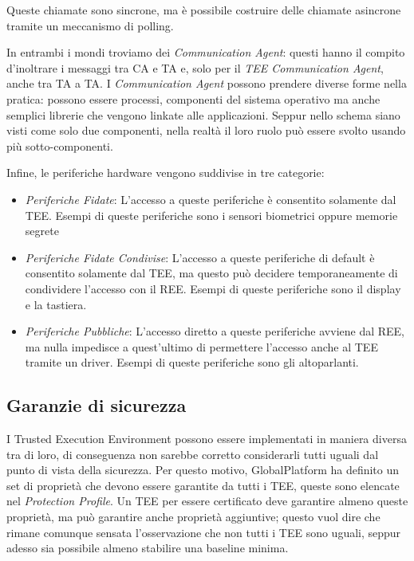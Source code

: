 \documentclass[12pt,italian]{report}
\begin{document}
Queste chiamate sono sincrone, ma è possibile costruire delle chiamate
asincrone tramite un meccanismo di polling.

In entrambi i mondi troviamo dei \textit{Communication Agent}: questi 
hanno il compito d'inoltrare i messaggi tra CA e TA e, solo per il
\textit{TEE Communication Agent}, anche tra TA a TA.
I \textit{Communication Agent} possono prendere diverse forme nella pratica:
possono essere processi, componenti del sistema operativo ma anche semplici
librerie che vengono linkate alle applicazioni.
Seppur nello schema siano visti come solo due componenti, nella realtà il loro
ruolo può essere svolto usando più sotto-componenti.

\bigbreak

\noindent Infine, le periferiche hardware vengono suddivise in tre categorie:
\begin{itemize}
    \item \textit{Periferiche Fidate}: L'accesso a queste periferiche è
    consentito solamente dal TEE. Esempi di queste periferiche sono i
    sensori biometrici oppure memorie segrete %
    \item \textit{Periferiche Fidate Condivise}: L'accesso a queste
    periferiche di default è consentito solamente dal TEE, ma questo può
    decidere temporaneamente di condividere l'accesso con il REE. Esempi di
    queste periferiche sono il display e la tastiera.
    \item \textit{Periferiche Pubbliche}: L'accesso diretto a queste
    periferiche avviene dal REE, ma nulla impedisce a quest'ultimo di
    permettere l'accesso anche al TEE tramite un driver. Esempi di queste
    periferiche sono gli altoparlanti.
\end{itemize}

\subsection{Garanzie di sicurezza}
\label{subsec:garanzie-sicurezza}
I Trusted Execution Environment possono essere implementati in maniera
diversa tra di loro, di conseguenza non sarebbe corretto considerarli tutti
uguali dal punto di vista della sicurezza.
Per questo motivo, GlobalPlatform ha definito un set di proprietà che
devono essere garantite da tutti i TEE, queste sono elencate nel
\textit{Protection Profile}\cite{gp2020protectionprofile}.
Un TEE per essere certificato deve garantire almeno queste proprietà, ma
può garantire anche proprietà aggiuntive; questo vuol dire che rimane
comunque sensata l'osservazione che non tutti i TEE sono uguali, seppur
adesso sia possibile almeno stabilire una baseline minima. 
\end{document}

